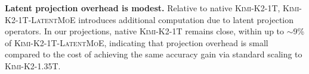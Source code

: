 \noindent \textbf{Latent projection overhead is modest.} Relative to native \textsc{Kimi-K2-1T}, \textsc{Kimi-K2-1T-LatentMoE} introduces additional computation due to latent projection operators. In our projections, native \textsc{Kimi-K2-1T} remains close, within up to $\sim$9\% of \textsc{Kimi-K2-1T-LatentMoE}, indicating that projection overhead is small compared to the cost of achieving the same accuracy gain via standard scaling to \textsc{Kimi-K2-1.35T}.
